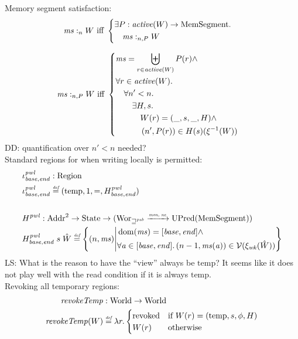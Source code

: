 \documentclass[a4paper]{article}
\newcommand{\monnefun}{\xrightarrow{\textit{\tiny{mon, ne}}}}
\newcommand{\fun}{\rightarrow}
\newcommand{\defeq}{\stackrel{\textit{\tiny{def}}}{=}}
\DeclareMathOperator{\dom}{dom}
\newcommand\lau[1]{{\color{purple} \sf \footnotesize {LS: #1}}\\}
\newcommand\dominique[1]{{\color{purple} \sf \footnotesize {DD: #1}}\\}
\newcommand{\var}[1]{\mathit{#1}}
\newcommand{\hs}{\var{ms}}
\newcommand{\ms}{\hs}
\newcommand{\addr}{\var{a}}
\newcommand{\start}{\var{base}}
\newcommand{\addrend}{\var{end}}
\newcommand{\heap}{\var{mem}}
\newcommand{\pwl}{\var{pwl}}
\newcommand{\plainfun}[2]{
  \ifthenelse{\equal{#2}{}}
  {\mathit{#1}}
  {\mathit{#1}(#2)}
}
\newcommand{\revokeTemp}[1]{\plainfun{revokeTemp}{#1}}
\newcommand{\activeReg}[1]{\plainfun{active}{#1}}
\newcommand{\futurewk}{\mathbin{\sqsupseteq}^{\var{pub}}}
\newcommand{\heapSat}[3][\heap]{#1 :_{#2} #3}
\newcommand{\memSatPar}[4][n]{\heapSat[#2]{#1 , #4}{#3}}
\newcommand{\asmType}{\plaindom{AsmType}}
\newcommand{\plaindom}[1]{\mathrm{#1}}
\newcommand{\Addrs}{\plaindom{Addr}}
\newcommand{\HeapSegments}{\plaindom{MemSegment}}
\newcommand{\States}{\plaindom{State}}
\newcommand{\Regions}{\plaindom{Region}}
\newcommand{\Worlds}{\plaindom{World}}
\newcommand{\Wor}{\plaindom{Wor}}
\newcommand{\Worwk}{\Wor_{\futurewk}}
\newcommand{\UPred}[1]{\plaindom{UPred}(#1)}
\newcommand{\intr}[2]{\mathcal{#1}}
\newcommand{\valueintr}[1]{\intr{V}{#1}}
\newcommand{\stdvr}{\valueintr{\asmType}}
\newcommand{\npair}[2][n]{\left(#1,#2 \right)}
\newcommand{\plainview}[1]{\mathrm{#1}}
\newcommand{\temp}{\plainview{temp}}
\newcommand{\revoked}{\plainview{revoked}}
\begin{document}
Memory segment satisfaction:
\begin{align*}
  &\heapSat[\hs]{n}{W} 
    \text{ iff }
    \left\{\begin{aligned}
        &\exists P : \activeReg{W} \rightarrow \HeapSegments \ldotp \\
        &\quad \memSatPar{\ms}{W}{P}
      \end{aligned}\right.
\end{align*}

\begin{align*}
  &\memSatPar{\ms}{W}{P}
    \text{ iff }
    \left\{\begin{aligned}
        &\hs = \biguplus_{r\in\activeReg{W}}P(r) \land \\
        &\forall r \in \activeReg{W} \ldotp\\
        &\quad  \forall n'<n \ldotp \\
        &\qquad \exists H,s \ldotp\\
        &\qquad \quad W(r) = (\_,s,\_,H) \land \\
        &\qquad \quad \npair[n']{P(r)} \in H(s)(\xi^{-1}(W))\\
      \end{aligned}\right.
\end{align*}
\dominique{quantification over $n' < n$ needed?}

Standard regions for when writing locally is permitted:
\begin{align*}
  &\iota_{\start,\addrend}^\pwl : \Regions\\
  &\iota_{\start,\addrend}^\pwl \defeq (\temp,1,=,H^\pwl_{\start,\addrend}) \\
  \\
  &H^\pwl : \Addrs^2 \fun \States \fun (\Worwk \monnefun \UPred{\HeapSegments})\\
  &H^\pwl_{\start,\addrend}\; s \; \hat{W} \defeq \left\{\npair{\hs} \middle|
    \begin{aligned}
      &\dom(\hs) = [\start,\addrend] \land \\
      &\forall \addr \in [\start,\addrend] \ldotp \npair[n-1]{\hs(\addr)} \in \stdvr(\xi_{\var{wk}}(\hat{W}))
    \end{aligned}
        \right\}
\end{align*}
\lau{What is the reason to have the ``view'' always be $\temp$? It seems like it does not play well with the read condition if it is always $\temp$.}
Revoking all temporary regions:
\begin{align*}
  \revokeTemp{} & : \Worlds \fun \Worlds \\
  \revokeTemp{W} & \defeq \lambda r \ldotp 
                   \begin{cases}
                     \revoked            & \text{if }W(r) = (\temp,s,\phi,H) \\
                     W(r)                & \text{otherwise}
                   \end{cases}
\end{align*}
\newcommand{\wrev}[1]{\revokeTemp{#1}}
\end{document}
